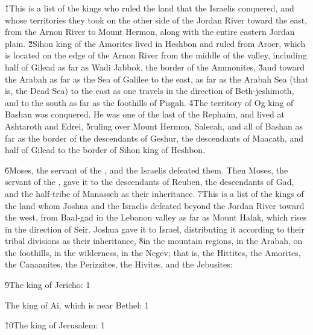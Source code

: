 \v{1}This is a list of the kings who ruled the land that the Israelis conquered, and whose territories they took on the other side of the Jordan River toward the east, from the Arnon River to Mount Hermon, along with the entire eastern Jordan plain. \v{2}Sihon king of the Amorites lived in Heshbon and ruled from Aroer, which is located on the edge of the Arnon River from the middle of the valley, including half of Gilead as far as Wadi Jabbok, the border of the Ammonites, \v{3}and toward the Arabah as far as the Sea of Galilee to the east, as far as the Arabah Sea (that is, the Dead Sea) to the east as one travels in the direction of Beth-jeshimoth, and to the south as far as the foothills of Pisgah. \v{4}The territory of Og king of Bashan was conquered. He was one of the last of the Rephaim, and lived at Ashtaroth and Edrei, \v{5}ruling over Mount Hermon, Salecah, and all of Bashan as far as the border of the descendants of Geshur, the descendants of Maacath, and half of Gilead to the border of Sihon king of Heshbon.

\v{6}Moses, the servant of the , and the Israelis defeated them. Then Moses, the servant of the , gave it to the descendants of Reuben, the descendants of Gad, and the half-tribe of Manasseh as their inheritance. \v{7}This is a list of the kings of the land whom Joshua and the Israelis defeated beyond the Jordan River toward the west, from Baal-gad in the Lebanon valley as far as Mount Halak, which rises in the direction of Seir. Joshua gave it to Israel, distributing it according to their tribal divisions as their inheritance, \v{8}in the mountain regions, in the Arabah, on the foothills, in the wilderness, in the Negev; that is, the Hittites, the Amorites, the Canaanites, the Perizzites, the Hivites, and the Jebusites:

\v{9}The king of Jericho: 1

The king of Ai, which is near Bethel: 1

\v{10}The king of Jerusalem: 1

